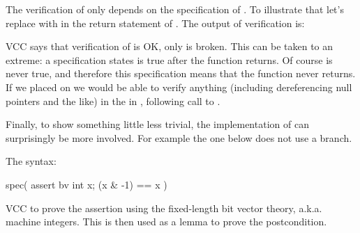 The verification of  only depends on the specification of .
To illustrate that let's replace \vcc{<} with \vcc{>} in the return statement of .
The output of verification is:


\noindent
VCC says that verification of  is OK, only  is broken.
This can be taken to an extreme: a specification 
states \vcc{\false} is true after the function returns. Of course \vcc{\false}
is never true, and therefore this specification means that the function never
returns.
If we placed  on  we would be able to verify
anything (including dereferencing null pointers and the like) in the in ,
following call to .

Finally, 
to show something little less trivial, the implementation of  can surprisingly be more involved.
For example the one below does not use a branch.


\noindent
The syntax:
\begin{VCC}
  spec( assert {bv} \forall int x; (x & -1) == x )
\end{VCC}

\noindent
VCC to prove the assertion using the fixed-length bit vector theory, a.k.a. machine integers.
This is then used as a lemma to prove the postcondition.

